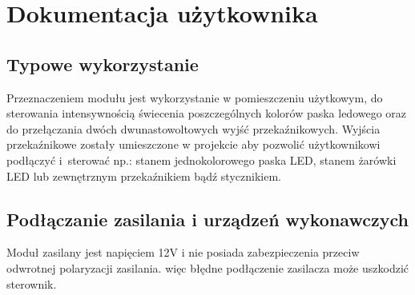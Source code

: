 \documentclass[12pt, eng, twoside, openany, final]{mgr}
\begin{document}
%
\chapter{Dokumentacja użytkownika}
\thispagestyle{fancy}
    \section{Typowe wykorzystanie}
    \indent
    Przeznaczeniem modułu jest wykorzystanie w pomieszczeniu użytkowym, do sterowania intensywnością świecenia poszczególnych kolorów paska ledowego oraz do przełączania dwóch dwunastowoltowych wyjść przekaźnikowych. Wyjścia przekaźnikowe zostały umieszczone w projekcie aby pozwolić użytkownikowi podłączyć i~sterować np.: stanem jednokolorowego paska LED, stanem żarówki LED lub zewnętrznym przekaźnikiem bądź stycznikiem.
    
    \section{Podłączanie zasilania i urządzeń wykonawczych}
    Moduł zasilany jest napięciem 12V i nie posiada zabezpieczenia przeciw odwrotnej polaryzacji zasilania. więc błędne podłączenie zasilacza może uszkodzić sterownik. 
    
\end{document}
